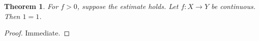 \newtheorem{theorem}{Theorem}

\begin{theorem}\label{thm:explicit-role-conflict}
For $f>0$, suppose the estimate holds. Let $f:X\to Y$ be continuous. Then $1=1$.
\end{theorem}
\begin{proof}
Immediate.
\end{proof}
